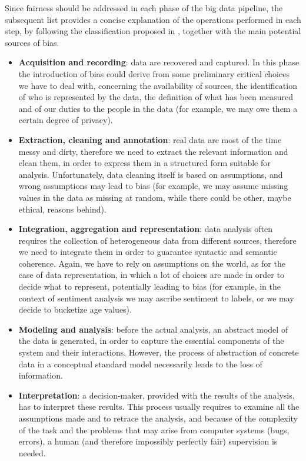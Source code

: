 Since fairness should be addressed in each phase of the big data pipeline, the subsequent list provides a concise explanation of the operations performed in each step, by following the classification proposed in \cite{jagadish2014big}, together with the main potential sources of bias.
\begin{itemize}
\item \textbf{Acquisition and recording}: data are recovered and captured. In this phase the introduction of bias could derive from some preliminary critical choices we have to deal with, concerning the availability of sources, the identification of who is represented by the data, the definition of what has been measured and of our duties to the people in the data (for example, we may owe them a certain degree of privacy).
\item \textbf{Extraction, cleaning and annotation}: real data are most of the time messy and dirty, therefore we need to extract the relevant information and clean them, in order to express them in a structured form suitable for analysis. Unfortunately, data cleaning itself is based on assumptions, and wrong assumptions may lead to bias (for example, we may assume missing values in the data as missing at random, while there could be other, maybe ethical, reasons behind).
\item \textbf{Integration, aggregation and representation}: data analysis often requires the collection of heterogeneous data from different sources, therefore we need to integrate them in order to guarantee syntactic and semantic coherence. Again, we have to rely on assumptions on the world, as for the case of data representation, in which a lot of choices are made in order to decide what to represent, potentially leading to bias (for example, in the context of sentiment analysis we may ascribe sentiment to labels, or we may decide to bucketize age values).
\item \textbf{Modeling and analysis}: before the actual analysis, an abstract model of the data is generated, in order to capture the essential components of the system and their interactions. However, the process of abstraction of concrete data in a conceptual standard model necessarily leads to the loss of information.
\item \textbf{Interpretation}: a decision-maker, provided with the results of the analysis, has to interpret these results. This process usually requires to examine all the assumptions made and to retrace the analysis, and because of the complexity of the task and the problems that may arise from computer systems (bugs, errors), a human (and therefore impossibly perfectly fair) supervision is needed.
\end{itemize}


